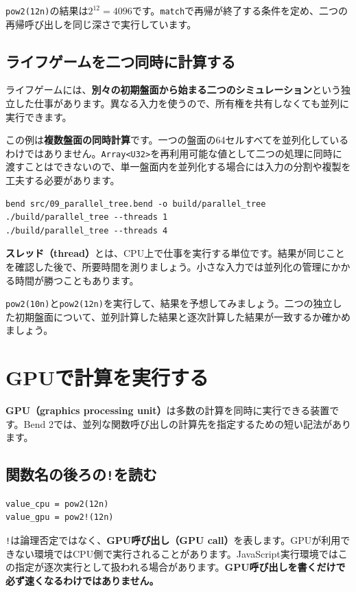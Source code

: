 \documentclass[11pt,a4paper,openany]{book}
\newcommand{\code}[1]{\texttt{#1}}
\newcommand{\term}[1]{\textbf{#1}}
\newcommand{\readcode}[2]{}
\newcommand{\exercise}[1]{\begin{exercisebox}#1\end{exercisebox}}
\begin{document}
\readcode{09_parallel_tree.bend}{二つに分割しながら値を足す（09\_parallel\_tree.bend）}
\code{pow2(12n)}の結果は\(2^{12}=4096\)です。\code{match}で再帰が終了する条件を定め、二つの再帰呼び出しを同じ深さで実行しています。

\section{ライフゲームを二つ同時に計算する}
ライフゲームには、\textbf{別々の初期盤面から始まる二つのシミュレーション}という独立した仕事があります。異なる入力を使うので、所有権を共有しなくても並列に実行できます。
\readcode{31_parallel_life_pair.bend}{独立した二つの盤面を並列に更新する（31\_parallel\_life\_pair.bend）}
この例は\textbf{複数盤面の同時計算}です。一つの盤面の64セルすべてを並列化しているわけではありません。\code{Array<U32>}を再利用可能な値として二つの処理に同時に渡すことはできないので、単一盤面内を並列化する場合には入力の分割や複製を工夫する必要があります。

\begin{lstlisting}[language={},caption={ネイティブCPU実行でスレッド数を比較する}]
bend src/09_parallel_tree.bend -o build/parallel_tree
./build/parallel_tree --threads 1
./build/parallel_tree --threads 4
\end{lstlisting}
\term{スレッド（thread）}とは、CPU上で仕事を実行する単位です。結果が同じことを確認した後で、所要時間を測りましょう。小さな入力では並列化の管理にかかる時間が勝つこともあります。
\exercise{\code{pow2(10n)}と\code{pow2(12n)}を実行して、結果を予想してみましょう。二つの独立した初期盤面について、並列計算した結果と逐次計算した結果が一致するか確かめましょう。}

\chapter{GPUで計算を実行する}
\begin{tcolorbox}[colback=blue!3,colframe=blue!16,boxrule=.35pt,arc=1mm,left=3mm,right=3mm,top=2mm,bottom=2mm]
\small \term{GPU（graphics processing unit）}は多数の計算を同時に実行できる装置です。Bend 2では、並列な関数呼び出しの計算先を指定するための短い記法があります。
\end{tcolorbox}

\section{関数名の後ろの\code{!}を読む}
\begin{lstlisting}[caption={通常の呼び出しとGPU呼び出し}]
value_cpu = pow2(12n)
value_gpu = pow2!(12n)
\end{lstlisting}
\code{!}は論理否定ではなく、\term{GPU呼び出し（GPU call）}を表します。GPUが利用できない環境ではCPU側で実行されることがあります。JavaScript実行環境ではこの指定が逐次実行として扱われる場合があります。\textbf{GPU呼び出しを書くだけで必ず速くなるわけではありません。}
\end{document}
